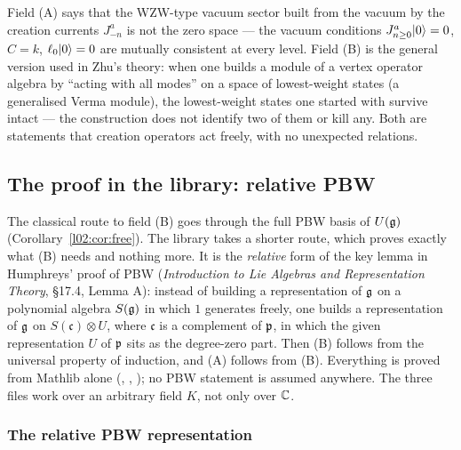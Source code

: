 \begin{physics}
Field (A) says that the WZW-type vacuum sector built from the vacuum by the creation currents
$J^a_{-n}$ is not the zero space --- the vacuum conditions $J^a_{n\ge0}|0\rangle = 0$, $C = k$,
$\ell_0|0\rangle = 0$ are mutually consistent at every level. Field (B) is the general version used in Zhu's
theory: when one builds a module of a vertex operator algebra by ``acting with all modes'' on a space of
lowest-weight states (a generalised Verma module), the lowest-weight states one started with survive
intact --- the construction does not identify two of them or kill any. Both are statements that
creation operators act freely, with no unexpected relations.
\end{physics}

\subsection{The proof in the library: relative PBW}\label{l02:sec:pbwproof}

The classical route to field (B) goes through the full PBW basis of $U(\mathfrak{g})$
(Corollary~\ref{l02:cor:free}). The library takes a shorter route, which proves exactly what (B) needs
and nothing more. It is the \emph{relative} form of the key lemma in Humphreys' proof of PBW
(\emph{Introduction to Lie Algebras and Representation Theory}, \S17.4, Lemma A): instead of building a
representation of $\mathfrak{g}$ on a polynomial algebra $S(\mathfrak{g})$ in which $1$ generates freely, one builds a
representation of $\mathfrak{g}$ on $S(\mathfrak c)\otimes U$, where $\mathfrak c$ is a complement of $\mathfrak{p}$, in
which the given representation $U$ of $\mathfrak{p}$ sits as the degree-zero part. Then (B) follows from the
universal property of induction, and (A) follows from (B). Everything is proved from Mathlib alone
(,
, ); no PBW statement is assumed anywhere. The three files
work over an arbitrary field $K$, not only over ${\mathbb{C}}$.

\subsubsection{The relative PBW representation}

